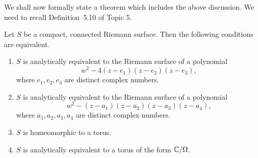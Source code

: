 \documentclass[a4paper,11pt]{article}
\begin{document}
We shall now formally state a theorem which includes the above
discussion.  We need to recall Definition~5.10 of Topic 5.

\begin{thm}
  \label{thm:1}
  Let $S$ be a compact, connected Riemann surface.  Then the following
  conditions are equivalent.
  \begin{enumerate}
  \item $S$ is analytically equivalent to the Riemann surface of a
    polynomial
    $$
    w^2 - 4(z-e_1)(z-e_2)(z-e_3),
    $$
    where $e_1, e_2, e_3$ are distinct complex numbers.
  \item $S$ is analytically equivalent to the Riemann surface of a
    polynomial
    $$
    w^2 - (z-a_1)(z-a_2)(z-a_3)(z-a_4),
    $$
    where $a_1, a_2, a_3, a_4$ are distinct complex numbers.
  \item $S$ is homeomorphic to a torus.
  \item $S$ is analytically equivalent to a torus of the form ${\mathbb C} /
    \Omega$.
  \end{enumerate}
\end{thm}
\end{document}
